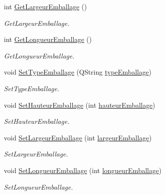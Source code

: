 \begin{DoxyCompactItemize}
int \mbox{\hyperlink{class_emballage_aef2c90e75a4a1dd31f733561f50a3569}{Get\+Largeur\+Emballage}} ()
\begin{DoxyCompactList}\small\item\em Get\+Largeur\+Emballage. \end{DoxyCompactList}\item 
int \mbox{\hyperlink{class_emballage_ab38aa0657c07c5ba3532be21334ab2f7}{Get\+Longueur\+Emballage}} ()
\begin{DoxyCompactList}\small\item\em Get\+Longueur\+Emballage. \end{DoxyCompactList}\item 
void \mbox{\hyperlink{class_emballage_af26f49fa86f70ec4bbb5eaca71865570}{Set\+Type\+Emballage}} (Q\+String \mbox{\hyperlink{class_emballage_a1a939a1b7ff146dbcfe585a59f53174c}{type\+Emballage}})
\begin{DoxyCompactList}\small\item\em Set\+Type\+Emballage. \end{DoxyCompactList}\item 
void \mbox{\hyperlink{class_emballage_a8a91d921f0cb30c14bbbec3858b2dfce}{Set\+Hauteur\+Emballage}} (int \mbox{\hyperlink{class_emballage_a8fdf2bff797b5405db34cbb365f02642}{hauteur\+Emballage}})
\begin{DoxyCompactList}\small\item\em Set\+Hauteur\+Emballage. \end{DoxyCompactList}\item 
void \mbox{\hyperlink{class_emballage_ac6733f3663c253d4cbfbeb467a35dfc1}{Set\+Largeur\+Emballage}} (int \mbox{\hyperlink{class_emballage_a1fe866728576ec8ee38a0c647e1f1bab}{largeur\+Emballage}})
\begin{DoxyCompactList}\small\item\em Set\+Largeur\+Emballage. \end{DoxyCompactList}\item 
void \mbox{\hyperlink{class_emballage_ad6d542ac95bc816d87816e9b5eb5ce0b}{Set\+Longueur\+Emballage}} (int \mbox{\hyperlink{class_emballage_a4c9b0f9c3e617eceac9f557177356e85}{longueur\+Emballage}})
\begin{DoxyCompactList}\small\item\em Set\+Longueur\+Emballage. \end{DoxyCompactList}\end{DoxyCompactItemize}
